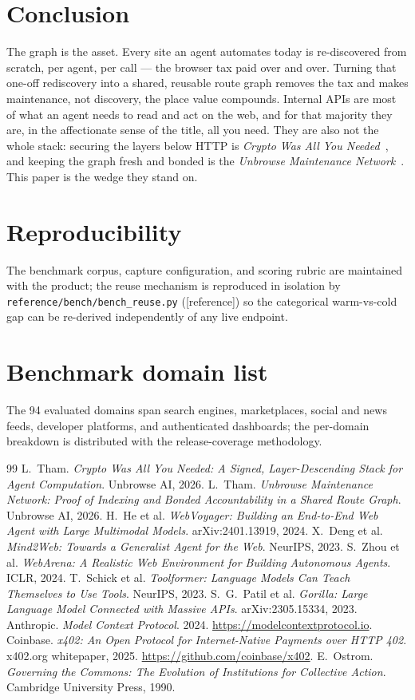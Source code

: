 \documentclass[11pt]{article}
\newcommand{\refimpl}{\textcolor{blue!70!black}{\small[reference]}}
\begin{document}
\section{Conclusion}
The graph is the asset. Every site an agent automates today is re-discovered from
scratch, per agent, per call --- the browser tax paid over and over. Turning that
one-off rediscovery into a shared, reusable route graph removes the tax and makes
maintenance, not discovery, the place value compounds. Internal APIs are most of
what an agent needs to read and act on the web, and for that majority they are, in
the affectionate sense of the title, all you need. They are also not the whole
stack: securing the layers below HTTP is \emph{Crypto Was All You
Needed}~\cite{security}, and keeping the graph fresh and bonded is the
\emph{Unbrowse Maintenance Network}~\cite{maintenance}. This paper is the wedge they
stand on.

\appendix
\section{Reproducibility}
The benchmark corpus, capture configuration, and scoring rubric are maintained with
the product; the reuse mechanism is reproduced in isolation by
\texttt{reference/bench/bench\_reuse.py} (\refimpl) so the categorical
warm-vs-cold gap can be re-derived independently of any live endpoint.

\section{Benchmark domain list}
The 94 evaluated domains span search engines, marketplaces, social and news feeds,
developer platforms, and authenticated dashboards; the per-domain breakdown is
distributed with the release-coverage methodology.

\begin{thebibliography}{99}
 L.~Tham. \emph{Crypto Was All You Needed: A Signed,
Layer-Descending Stack for Agent Computation}. Unbrowse AI, 2026.
 L.~Tham. \emph{Unbrowse Maintenance Network: Proof of
Indexing and Bonded Accountability in a Shared Route Graph}. Unbrowse AI, 2026.
 H.~He et al. \emph{WebVoyager: Building an End-to-End Web Agent
with Large Multimodal Models}. arXiv:2401.13919, 2024.
 X.~Deng et al. \emph{Mind2Web: Towards a Generalist Agent for the
Web}. NeurIPS, 2023.
 S.~Zhou et al. \emph{WebArena: A Realistic Web Environment for
Building Autonomous Agents}. ICLR, 2024.
 T.~Schick et al. \emph{Toolformer: Language Models Can Teach
Themselves to Use Tools}. NeurIPS, 2023.
 S.~G.~Patil et al. \emph{Gorilla: Large Language Model Connected
with Massive APIs}. arXiv:2305.15334, 2023.
 Anthropic. \emph{Model Context Protocol}. 2024.
\url{https://modelcontextprotocol.io}.
 Coinbase. \emph{x402: An Open Protocol for Internet-Native Payments
over HTTP 402}. x402.org whitepaper, 2025. \url{https://github.com/coinbase/x402}.
 E.~Ostrom. \emph{Governing the Commons: The Evolution of
Institutions for Collective Action}. Cambridge University Press, 1990.
\end{thebibliography}
\end{document}
